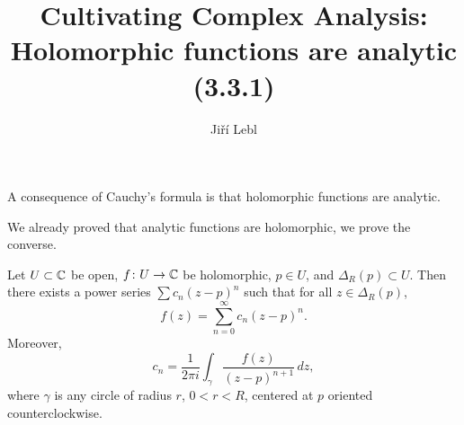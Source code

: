 \documentclass[10pt,aspectratio=169]{beamer}
\author{Ji\v{r}\'i Lebl}
\institute[OSU]{%
Departemento pri Matematiko de Oklahoma {\^S}tata Universitato}
\title{Cultivating Complex Analysis:\\%
Holomorphic functions are analytic (3.3.1)}
\date{}
\begin{document}
\begin{frame}
\titlepage
\end{frame}

\begin{frame}
A consequence of Cauchy's formula is
that holomorphic functions are analytic.

\medskip
\pause

We already proved
that analytic functions are holomorphic, we prove the converse.

\pause

\begin{theorem} \label{thm:holpower}
Let $U \subset {\mathbb{C}}$ be open, $f \colon U \to {\mathbb{C}}$ be
holomorphic, $p \in U$, and $\Delta_R(p) \subset U$.
\pause
Then there exists a power series $\sum c_n {(z-p)}^n$
such that for all $z \in \Delta_R(p)$,
\begin{equation*}
f(z) = \sum_{n=0}^\infty c_n {(z-p)}^n .
\end{equation*}
\pause
Moreover,
\begin{equation*}
c_n = 
\frac{1}{2\pi i}
\int_{\gamma}
\frac{f(z)}{{(z-p)}^{n+1}}
\,
dz  ,
\end{equation*}
where $\gamma$ is any circle of radius $r$, $0 < r < R$, centered at
$p$ oriented counterclockwise.
\end{theorem}

\end{frame}
\end{document}
